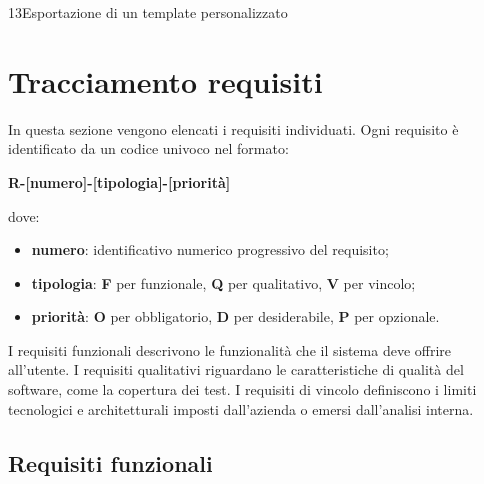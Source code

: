 \begin{usecase}{13}{Esportazione di un template personalizzato}
\label{uc:13}
\end{usecase}

\section{Tracciamento requisiti}

In questa sezione vengono elencati i requisiti individuati. Ogni requisito è identificato da un codice univoco nel formato:
\begin{center}
    \textbf{R-[numero]-[tipologia]-[priorità]}
\end{center}
dove:
\begin{itemize}
    \item \textbf{numero}: identificativo numerico progressivo del requisito;
    \item \textbf{tipologia}: \textbf{F} per funzionale, \textbf{Q} per qualitativo, \textbf{V} per vincolo;
    \item \textbf{priorità}: \textbf{O} per obbligatorio, \textbf{D} per desiderabile, \textbf{P} per opzionale.
\end{itemize}
I requisiti funzionali descrivono le funzionalità che il sistema deve offrire all'utente. I requisiti qualitativi riguardano le caratteristiche di qualità del software, come la copertura dei test. I requisiti di vincolo definiscono i limiti tecnologici e architetturali imposti dall'azienda o emersi dall'analisi interna.

\subsection{Requisiti funzionali}

